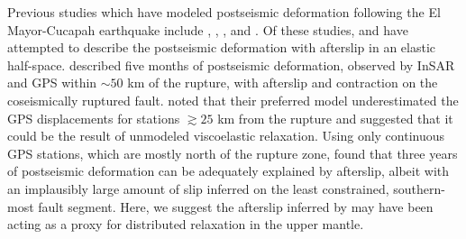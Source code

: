 \documentclass[draft,linenumbers]{AGUJournal}
\providecommand{\DIFadd}[1]{{\protect\color{blue}\uwave{#1}}} %
\providecommand{\DIFaddbegin}{} %
\providecommand{\DIFaddend}{} %
\begin{document}
Previous studies which have modeled postseismic deformation following the El Mayor-Cucapah earthquake include \citet{Pollitz2012}, \citet{Gonzalez-ortega2014}, \citet{Spinler2015}, and \citet{Rollins2015}. Of these studies, \citet{Gonzalez-ortega2014} and \citet{Rollins2015} have attempted to describe the postseismic deformation with afterslip in an elastic half-space.  \citet{Gonzalez-ortega2014} described five months of postseismic deformation, observed by InSAR and GPS \DIFaddbegin \DIFadd{stations }\DIFaddend within ${\sim}50$ km of the rupture, with afterslip and contraction on the coseismically ruptured fault. \citet{Gonzalez-ortega2014} noted that their preferred model underestimated the GPS displacements for stations $\gtrsim 25$ km from the rupture and suggested that it could be the result of unmodeled viscoelastic relaxation.  Using only continuous GPS stations, which are mostly north of the rupture zone, \citet{Rollins2015} found that three years of postseismic deformation can be adequately explained by afterslip, albeit with an implausibly large amount of slip inferred on the least constrained, southern-most fault segment. Here, we suggest the afterslip inferred by \citet{Rollins2015} may have been acting as a proxy for distributed relaxation in the upper mantle. 
\end{document}
